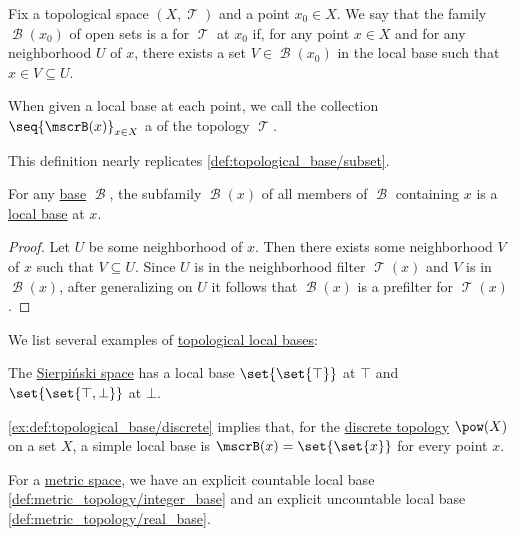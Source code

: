 \begin{definition}\label{def:topological_local_base}
  Fix a topological space \( (X, \mscrT) \) and a point \( x_0 \in X \). We say that the family \( \mscrB(x_0) \) of open sets is a  for \( \mscrT \) at \( x_0 \) if, for any point \( x \in X \) and for any neighborhood \( U \) of \( x \), there exists a set \( V \in \mscrB(x_0) \) in the local base such that \( x \in V \subseteq U \).

  When given a local base at each point, we call the collection \( \seq{ \mscrB(x) }_{x \in X} \) a  of the topology \( \mscrT \).
\end{definition}
\begin{comments}
  \item This definition nearly replicates \cref{def:topological_base/subset}.
\end{comments}

\begin{proposition}\label{thm:global_base_to_local_base}
  For any \hyperref[def:topological_base]{base} \( \mscrB \), the subfamily \( \mscrB(x) \) of all members of \( \mscrB \) containing \( x \) is a \hyperref[def:topological_local_base]{local base} at \( x \).
\end{proposition}
\begin{proof}
  Let \( U \) be some neighborhood of \( x \). Then there exists some neighborhood \( V \) of \( x \) such that \( V \subseteq U \). Since \( U \) is in the neighborhood filter \( \mscrT(x) \) and \( V \) is in \( \mscrB(x) \), after generalizing on \( U \) it follows that \( \mscrB(x) \) is a prefilter for \( \mscrT(x) \).
\end{proof}

\begin{example}\label{ex:def:topological_local_base}
  We list several examples of \hyperref[def:topological_local_base]{topological local bases}:
  \begin{thmenum}
     The \hyperref[def:sierpinski_space]{Sierpi\'nski space} has a local base \( \set{ \set{ \top } } \) at \( \top \) and \( \set{ \set{ \top, \bot } } \) at \( \bot \).

     \cref{ex:def:topological_base/discrete} implies that, for the \hyperref[def:discrete_topology]{discrete topology} \( \pow(X) \) on a set \( X \), a simple local base is \( \mscrB(x) = \set{ \set{ x } } \) for every point \( x \).

     For a \hyperref[def:metric_space]{metric space}, we have an explicit countable local base \eqref{def:metric_topology/integer_base} and an explicit uncountable local base \eqref{def:metric_topology/real_base}.
  \end{thmenum}
\end{example}


